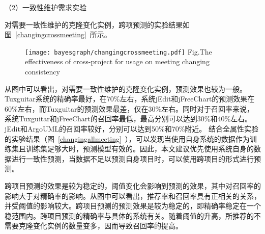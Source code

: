 
（2）一致性维护需求实验

对需要一致性维护的克隆变化实例，跨项预测的实验结果如图~\ref{changingcrossmeeting}~所示。

\begin{figure}[h]
\centering
\texttt{[image: bayesgraph/changingcrossmeeting.pdf]}
{Fig.$\!$}{The effectiveness of cross-project for usage on meeting changing consistency}
\vspace{-1em}
\end{figure}

从图中可以看出，对需要一致性维护的克隆变化实例，预测效果也较为一般。Tuxguitar系统的精确率最好，在70\%左右，系统jEdit和jFreeChart的预测效果在60\%左右，而Tuxguitar的预测效果最差，仅在30\%左右。同时对于召回率来说，系统Tuxguitar和jFreeChart的召回率最低，最高分别可以达到30\%和40\%左右。jEdit和ArgoUML的召回率较好，分别可以达到50\%和70\%附近。
结合全属性实验的实验结果（图~\ref{changingallmeeting}~），可以发现当使用自身系统的数据作为训练集且训练集足够大时，预测模型有效的。因此，本文建议优先使用系统自身的数据进行一致性预测，当数据不足以预测自身项目时，可以使用跨项目的形式进行预测。

跨项目预测的效果是较为稳定的，阈值变化会影响到预测的效果，其中对召回率的影响大于对精确率的影响。从图中可以看出，推荐率和召回率具有正相关的关系，并受阈值的影响较大。跨项目预测的预测效果是较为稳定的，即精确率稳定在一个稳范围内。跨项目预测的精确率与具体的系统有关。随着阈值的升高，所推荐的不需要克隆变化实例的数量变多，因而导致召回率的提高。

